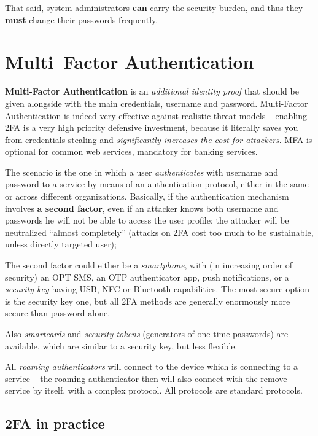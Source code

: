\documentclass[10pt]{extbook}
\begin{document}
That said, system administrators \textbf{can} carry the security burden, and
thus they \textbf{must} change their passwords frequently.

\chapter{Multi--Factor Authentication}

\textbf{Multi\--Factor Authentication} is an \emph{additional identity proof}
that should be given alongside with the main credentials, username and
password. Multi\--Factor Authentication is indeed very effective against
realistic threat models -- enabling 2FA is a very high priority defensive
investment, because it literally saves you from credentials stealing and
\emph{significantly increases the cost for attackers}. MFA is optional for
common web services, mandatory for banking services.

The scenario is the one in which a user \emph{authenticates} with username and
password to a service by means of an authentication protocol, either in the
same or across different organizations. Basically, if the authentication
mechanism involves \textbf{a second factor}, even if an attacker knows both
username and passwords he will not be able to access the user profile; the
attacker will be neutralized ``almost completely'' (attacks on 2FA cost too
much to be sustainable, unless directly targeted user);

The second factor could either be a \emph{smartphone}, with (in increasing
order of security) an OPT SMS, an OTP authenticator app, push notifications, or
a \emph{security key} having USB, NFC or Bluetooth capabilities. The most
secure option is the security key one, but all 2FA methods are generally
enormously more secure than password alone.

Also \emph{smartcards} and \emph{security tokens} (generators of
one\--time\--passwords) are available, which are similar to a security key, but
less flexible.

All \emph{roaming authenticators} will connect to the device which is
connecting to a service -- the roaming authenticator then will also connect
with the remove service by itself, with a complex protocol. All protocols are
standard protocols.

\section{2FA in practice}
\end{document}

